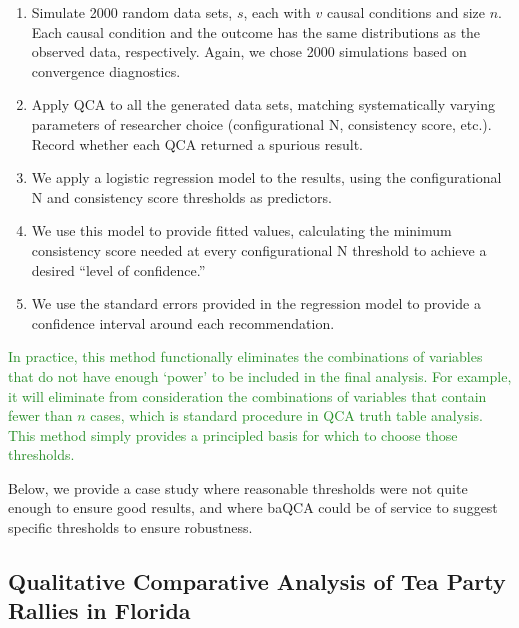\documentclass[12pt]{article}
\let\footnote=\endnote
\begin{document}
{{{{\begin{enumerate}
  \item Simulate 2000 random data sets, $s$, each with $v$ causal conditions and size $n$. Each causal condition and the outcome has the same distributions as the observed data, respectively. Again, we chose 2000 simulations based on \cite{gelman_and_rubin_1992} convergence diagnostics. 
  \item Apply QCA to all the generated data sets, matching systematically varying parameters of researcher choice (configurational N, consistency score, etc.). Record whether each QCA returned a spurious result. 
  \item We apply a logistic regression model to the results, using the configurational N and consistency score thresholds as predictors.
  \item We use this model to provide fitted values, calculating the minimum consistency score needed at every configurational N threshold to achieve a desired ``level of confidence.'' 
  \item We use the standard errors provided in the regression model to provide a confidence interval around each recommendation.
\end{enumerate}

\textcolor{ForestGreen} {In practice, this method functionally eliminates the combinations of variables that do not have enough `power' to be included in the final analysis. For example, it will eliminate from consideration the combinations of variables that contain fewer than $n$ cases, which  is standard procedure in QCA truth table analysis. This method simply provides a principled basis for which to choose those thresholds.}  \footnote{\textcolor{ForestGreen} {Like in any QCA analysis, researchers should take care to observe which cases are being eliminated, and consider how this would change the results if the thresholds were lowered.}}



Below, we provide a case study where reasonable thresholds were not quite enough to ensure good results, and where baQCA could be of service to suggest specific thresholds to ensure robustness. 



\subsection{Qualitative Comparative Analysis of Tea Party Rallies in Florida}


}}}}
\end{document}
